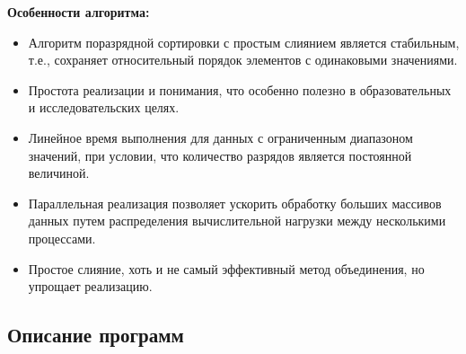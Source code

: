 \documentclass[a4paper, 14pt]{article}
\begin{document}
\textbf{Особенности алгоритма:}
\vspace{-1em}
\begin{itemize}
    \item  Алгоритм поразрядной сортировки с простым слиянием является стабильным, т.е., сохраняет относительный порядок элементов с одинаковыми значениями.
    \item  Простота реализации и понимания, что особенно полезно в образовательных и исследовательских целях.
    \item  Линейное время выполнения для данных с ограниченным диапазоном значений, при условии, что количество разрядов является постоянной величиной.
     \item   Параллельная реализация позволяет ускорить обработку больших массивов данных путем распределения вычислительной нагрузки между несколькими процессами.
     \item   Простое слияние, хоть и не самый эффективный метод объединения, но упрощает реализацию.
\end{itemize}

	\newpage
	\subsection*{\centering Описание программ}
\end{document}
